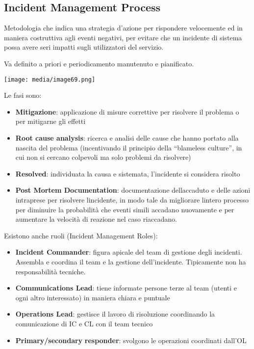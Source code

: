 \subsection{Incident Management
Process}\label{incident-management-process}

Metodologia che indica una strategia d'azione per rispondere velocemente
ed in maniera costruttiva agli eventi negativi, per evitare che un
incidente di sistema possa avere seri impatti sugli utilizzatori del
servizio.

Va definito a priori e periodicamento manutenuto e pianificato.

\texttt{[image: media/image69.png]}

Le fasi sono:

\begin{itemize}
\item
  \textbf{Mitigazione}: applicazione di misure correttive per risolvere
  il problema o per mitigarne gli effetti
\item
  \textbf{Root cause analysis}: ricerca e analisi delle cause che hanno
  portato alla nascita del problema (incentivando il principio della
  ``blameless culture'', in cui non si cercano colpevoli ma solo
  problemi da risolvere)
\item
  \textbf{Resolved}: individuata la causa e sistemata, l'incidente si
  considera risolto
\item
  \textbf{Post Mortem Documentation}: documentazione
  dell\textquotesingle accaduto e delle azioni intraprese per risolvere
  l\textquotesingle incidente, in modo tale da migliorare
  l\textquotesingle intero processo per diminuire la probabilità che
  eventi simili accadano nuovamente e per aumentare la velocità di
  reazione nel caso riaccadano.
\end{itemize}

Esistono anche ruoli (Incident Management Roles):

\begin{itemize}
\item
  \textbf{Incident Commander}: figura apicale del team di gestione degli
  incidenti. Assembla e coordina il team e la gestione dell'incidente.
  Tipicamente non ha responsabilità tecniche.
\item
  \textbf{Communications Lead}: tiene informate persone terze al team
  (utenti e ogni altro interessato) in maniera chiara e puntuale
\item
  \textbf{Operations Lead}: gestisce il lavoro di risoluzione
  coordinando la comunicazione di IC e CL con il team tecnico
\item
  \textbf{Primary/secondary} \textbf{responder}: svolgono le operazioni
  coordinati dall'OL
\end{itemize}

